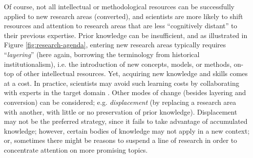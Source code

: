 \documentclass{article}
\begin{document}
Of course, not all intellectual or methodological resources can be successfully applied to new research areas (converted), and scientists are more likely to shift resources and attention to research areas that are less ``cognitively distant'' to their previous expertise. Prior knowledge can be insufficient, and as illustrated in Figure \ref{fig:research-agenda}, entering new research areas typically requires ``\textit{layering}'' (here again, borrowing the terminology from historical institutionalism), i.e. the introduction of new concepts, models, or methods, on-top of other intellectual resources. Yet, acquiring new knowledge and skills comes at a cost. In practice, scientists may avoid such learning costs by collaborating with experts in the target domain \citep{Tripodi2020}. Other modes of change (besides layering and conversion) can be considered; e.g. \textit{displacement} (by replacing a research area with another, with little or no preservation of prior knowledge). %
Displacement may not be the preferred strategy, since it fails to take advantage of accumulated knowledge; however, certain bodies of knowledge may not apply in a new context; or, sometimes there might be reasons to suspend a line of research in order to concentrate attention on more promising topics. 
\end{document}
